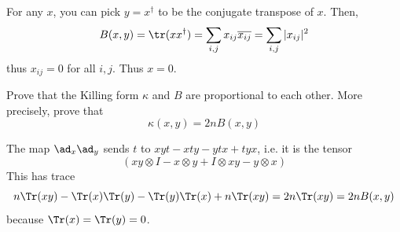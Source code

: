 \documentclass[11pt, headheight=30pt]{scrartcl}
\begin{document}
For any $x$, you can pick $y = x^\dagger$ to be the conjugate transpose of $x$.
Then,
\[
    B(x,y) = \tr(x x^\dagger) = \sum_{i,j} x_{ij} \overline{x_{ij}} = \sum_{i,j} |x_{ij}|^2    
\]
thus $x_{ij} = 0$ for all $i,j$. Thus $x = 0$.


\begin{prob}
    Prove that the Killing form $\kappa$ and $B$ are proportional to each other. More precisely,
    prove that
    \[
        \kappa(x, y) = 2nB(x, y)
    \]
\end{prob}

The map $\ad_x \ad_y$ sends $t$ to $xyt - xty - ytx + tyx$, i.e. it is the tensor
\[
    (xy\otimes I - x\otimes y + I\otimes xy - y\otimes x)    
\]
This has trace
\[
    n\Tr(xy) - \Tr(x)\Tr(y) - \Tr(y)\Tr(x) + n\Tr(xy) = 2n\Tr(xy) = 2nB(x,y)   
\]
because $\Tr(x) = \Tr(y) = 0$.





\end{document}
